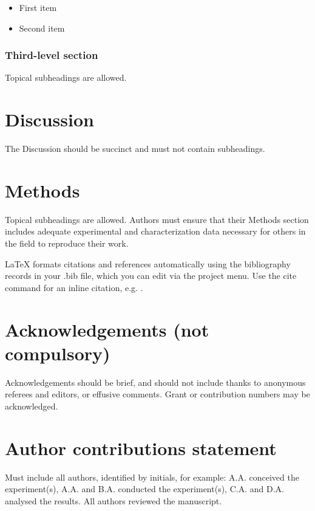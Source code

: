 \documentclass[fleqn,10pt]{./class/wlscirep}
\begin{document}
\begin{itemize}
\item First item
\item Second item
\end{itemize}

\subsubsection*{Third-level section}
 
Topical subheadings are allowed.

\section*{Discussion}

The Discussion should be succinct and must not contain subheadings.

\section*{Methods}

Topical subheadings are allowed. Authors must ensure that their Methods section includes adequate experimental and characterization data necessary for others in the field to reproduce their work.



\noindent LaTeX formats citations and references automatically using the bibliography records in your .bib file, which you can edit via the project menu. Use the cite command for an inline citation, e.g.  \cite{Figueredo:2009dg}.

\section*{Acknowledgements (not compulsory)}

Acknowledgements should be brief, and should not include thanks to anonymous referees and editors, or effusive comments. Grant or contribution numbers may be acknowledged.

\section*{Author contributions statement}

Must include all authors, identified by initials, for example:
A.A. conceived the experiment(s),  A.A. and B.A. conducted the experiment(s), C.A. and D.A. analysed the results.  All authors reviewed the manuscript. 
\end{document}
